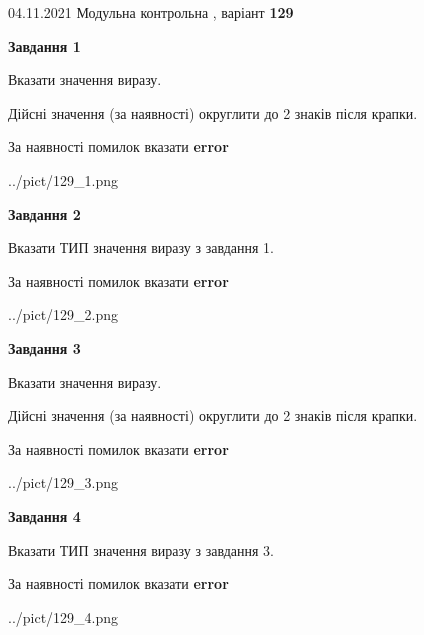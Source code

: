 \documentclass[11pt, ukrainian]{article}
\begin{document}
{04.11.2021 Модульна контрольна , варіант  \No \textbf { 129 }\par}
{
\begin {large}
{\begin {center}\textbf{Завдання 1}\end {center}}\par
Вказати значення виразу. \par
Дійсні значення (за наявності) округлити до 2 знаків після крапки. \par
За наявності помилок вказати \textbf{error}

\begin{center}
	{../pict/129_1.png}
\end{center}
\newpage

{\begin {center}\textbf{Завдання 2}\end {center}}\par
Вказати ТИП значення виразу з завдання 1. \par
За наявності помилок вказати \textbf{error}

\begin{center}
	{../pict/129_2.png}
\end{center}
\newpage

{\begin {center}\textbf{Завдання 3}\end {center}}\par
Вказати значення виразу. \par
Дійсні значення (за наявності) округлити до 2 знаків після крапки. \par
За наявності помилок вказати \textbf{error}

\begin{center}
	{../pict/129_3.png}
\end{center}
\newpage

{\begin {center}\textbf{Завдання 4}\end {center}}\par
Вказати ТИП значення виразу з завдання 3. \par
За наявності помилок вказати \textbf{error}

\begin{center}
	{../pict/129_4.png}
\end{center}
\newpage


\end{large}}
\end{document}
